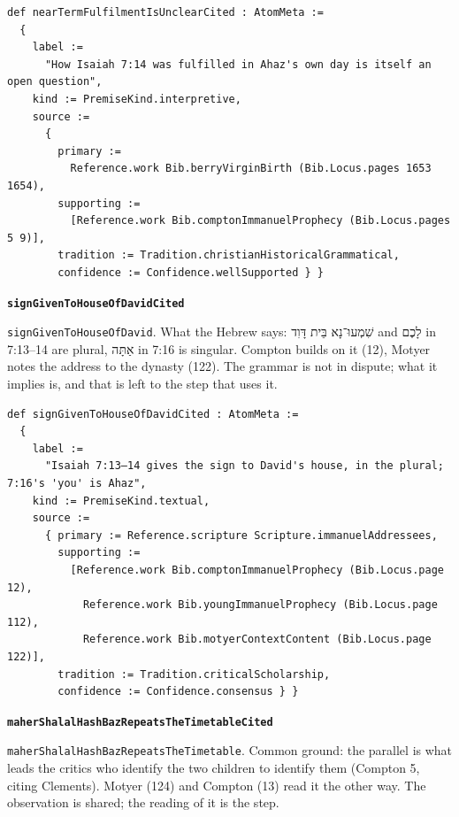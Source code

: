 \documentclass[11pt]{article}
\begin{document}
{\small\begin{verbatim}
def nearTermFulfilmentIsUnclearCited : AtomMeta :=
  {
    label :=
      "How Isaiah 7:14 was fulfilled in Ahaz's own day is itself an open question",
    kind := PremiseKind.interpretive,
    source :=
      {
        primary :=
          Reference.work Bib.berryVirginBirth (Bib.Locus.pages 1653 1654),
        supporting :=
          [Reference.work Bib.comptonImmanuelProphecy (Bib.Locus.pages 5 9)],
        tradition := Tradition.christianHistoricalGrammatical,
        confidence := Confidence.wellSupported } }
\end{verbatim}}
\par\medskip\noindent\textbf{\texttt{sign\allowbreak{}Given\allowbreak{}To\allowbreak{}House\allowbreak{}Of\allowbreak{}David\allowbreak{}Cited}}\par\nobreak\noindent
\texttt{sign\allowbreak{}Given\allowbreak{}To\allowbreak{}House\allowbreak{}Of\allowbreak{}David}. What the Hebrew says: שִׁמְעוּ־נָא בֵּית דָּוִד and לָכֶם in 7:13–14 are plural, אַתָּה in 7:16 is singular. Compton builds on it (12), Motyer notes the address to the dynasty (122). The grammar is not in dispute; what it implies is, and that is left to the step that uses it.

{\small\begin{verbatim}
def signGivenToHouseOfDavidCited : AtomMeta :=
  {
    label :=
      "Isaiah 7:13–14 gives the sign to David's house, in the plural; 7:16's 'you' is Ahaz",
    kind := PremiseKind.textual,
    source :=
      { primary := Reference.scripture Scripture.immanuelAddressees,
        supporting :=
          [Reference.work Bib.comptonImmanuelProphecy (Bib.Locus.page 12),
            Reference.work Bib.youngImmanuelProphecy (Bib.Locus.page 112),
            Reference.work Bib.motyerContextContent (Bib.Locus.page 122)],
        tradition := Tradition.criticalScholarship,
        confidence := Confidence.consensus } }
\end{verbatim}}
\par\medskip\noindent\textbf{\texttt{maher\allowbreak{}Shalal\allowbreak{}Hash\allowbreak{}Baz\allowbreak{}Repeats\allowbreak{}The\allowbreak{}Timetable\allowbreak{}Cited}}\par\nobreak\noindent
\texttt{maher\allowbreak{}Shalal\allowbreak{}Hash\allowbreak{}Baz\allowbreak{}Repeats\allowbreak{}The\allowbreak{}Timetable}. Common ground: the parallel is what leads the critics who identify the two children to identify them (Compton 5, citing Clements). Motyer (124) and Compton (13) read it the other way. The observation is shared; the reading of it is the step.
\end{document}
